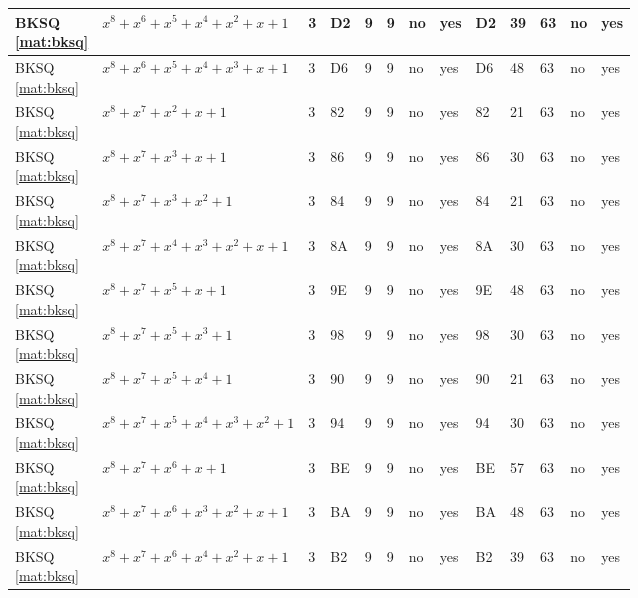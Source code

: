 \begin{tiny}
\begin{longtable}{|l|l|l|l|l|l|l|l|l|l|l|l|l|}
\shortstack{BKSQ \\ \eqref{mat:bksq}} & $x^8 + x^6 + x^5 + x^4 + x^2 + x + 1$ & 3 & D2 & 9 & 9 & no & yes & D2 & 39 & 63 & no & yes \\ \hline
\shortstack{BKSQ \\ \eqref{mat:bksq}} & $x^8 + x^6 + x^5 + x^4 + x^3 + x + 1$ & 3 & D6 & 9 & 9 & no & yes & D6 & 48 & 63 & no & yes \\ \hline
\shortstack{BKSQ \\ \eqref{mat:bksq}} & $x^8 + x^7 + x^2 + x + 1$ & 3 & 82 & 9 & 9 & no & yes & 82 & 21 & 63 & no & yes \\ \hline
\shortstack{BKSQ \\ \eqref{mat:bksq}} & $x^8 + x^7 + x^3 + x + 1$ & 3 & 86 & 9 & 9 & no & yes & 86 & 30 & 63 & no & yes \\ \hline
\shortstack{BKSQ \\ \eqref{mat:bksq}} & $x^8 + x^7 + x^3 + x^2 + 1$ & 3 & 84 & 9 & 9 & no & yes & 84 & 21 & 63 & no & yes \\ \hline
\shortstack{BKSQ \\ \eqref{mat:bksq}} & $x^8 + x^7 + x^4 + x^3 + x^2 + x + 1$ & 3 & 8A & 9 & 9 & no & yes & 8A & 30 & 63 & no & yes \\ \hline
\shortstack{BKSQ \\ \eqref{mat:bksq}} & $x^8 + x^7 + x^5 + x + 1$ & 3 & 9E & 9 & 9 & no & yes & 9E & 48 & 63 & no & yes \\ \hline
\shortstack{BKSQ \\ \eqref{mat:bksq}} & $x^8 + x^7 + x^5 + x^3 + 1$ & 3 & 98 & 9 & 9 & no & yes & 98 & 30 & 63 & no & yes \\ \hline
\shortstack{BKSQ \\ \eqref{mat:bksq}} & $x^8 + x^7 + x^5 + x^4 + 1$ & 3 & 90 & 9 & 9 & no & yes & 90 & 21 & 63 & no & yes \\ \hline
\shortstack{BKSQ \\ \eqref{mat:bksq}} & $x^8 + x^7 + x^5 + x^4 + x^3 + x^2 + 1$ & 3 & 94 & 9 & 9 & no & yes & 94 & 30 & 63 & no & yes \\ \hline
\shortstack{BKSQ \\ \eqref{mat:bksq}} & $x^8 + x^7 + x^6 + x + 1$ & 3 & BE & 9 & 9 & no & yes & BE & 57 & 63 & no & yes \\ \hline
\shortstack{BKSQ \\ \eqref{mat:bksq}} & $x^8 + x^7 + x^6 + x^3 + x^2 + x + 1$ & 3 & BA & 9 & 9 & no & yes & BA & 48 & 63 & no & yes \\ \hline
\shortstack{BKSQ \\ \eqref{mat:bksq}} & $x^8 + x^7 + x^6 + x^4 + x^2 + x + 1$ & 3 & B2 & 9 & 9 & no & yes & B2 & 39 & 63 & no & yes \\ \hline

\end{longtable}
\end{tiny}

